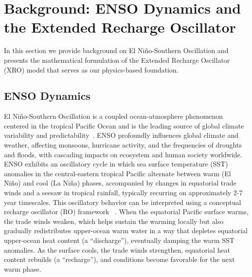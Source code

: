\section{Background: ENSO Dynamics and the Extended Recharge Oscillator}
\label{sec:background}

In this section we provide background on El Ni\~no-Southern Oscillation and presents the mathematical formulation of the Extended Recharge Oscillator (XRO) model that serves as our physics-based foundation.

\subsection{ENSO Dynamics}

El Ni\~no-Southern Oscillation is a coupled ocean-atmosphere phenomenon centered in the tropical Pacific Ocean and is the leading source of global climate variability and predictability~\cite{mcphaden2006enso,timmermann2018enso}. ENSO profoundly influences global climate and weather, affecting monsoons, hurricane activity, and the frequencies of droughts and floods, with cascading impacts on ecosystem and human society worldwide. ENSO exhibits an oscillatory cycle in which sea surface temperature (SST) anomalies in the central-eastern tropical Pacific alternate between warm (El Ni\~no) and cool (La Ni\~na) phases, accompanied by changes in equatorial trade winds and a seesaw in tropical rainfall, typically recurring on approximately 2-7 year timescales. This oscillatory behavior can be interpreted using a conceptual recharge oscillator (RO) framework ~\cite{jin1997equatorial,ZebiakCane1987, Bjerknes1969Teleconnections}. When the equatorial Pacific surface warms, the trade winds weaken, which helps sustain the warming locally but also gradually redistributes upper-ocean warm water in a way that depletes equatorial upper-ocean heat content (a ``discharge''), eventually damping the warm SST anomalies. As the surface cools, the trade winds strengthen, equatorial heat content rebuilds (a ``recharge''), and conditions become favorable for the next warm phase. 


